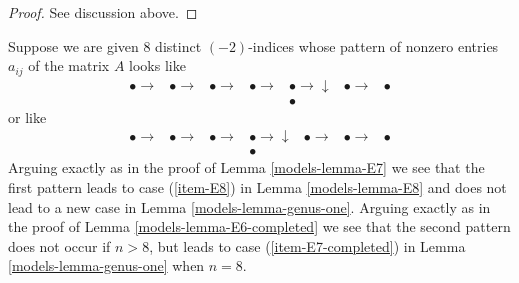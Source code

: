 \begin{proof}
See discussion above.
\end{proof}

Suppose we are given $8$ distinct $(-2)$-indices whose pattern
of nonzero entries $a_{ij}$ of the matrix $A$ looks like
$$
\begin{array}{ccccccc}\bullet \longrightarrow & \bullet \longrightarrow & \bullet \longrightarrow & \bullet \longrightarrow & \bullet \longrightarrow\downarrow & \bullet \longrightarrow & \bullet \\  &  &  &  & \bullet &  & \end{array}
$$
or like
$$
\begin{array}{ccccccc}\bullet \longrightarrow & \bullet \longrightarrow & \bullet \longrightarrow & \bullet \longrightarrow\downarrow & \bullet \longrightarrow & \bullet \longrightarrow & \bullet \\  &  &  & \bullet &  &  & \end{array}
$$
Arguing exactly as in the proof of Lemma \ref{models-lemma-E7}
we see that the first pattern leads to case
(\ref{item-E8}) in Lemma \ref{models-lemma-E8}
and does not lead to a new case in Lemma \ref{models-lemma-genus-one}.
Arguing exactly as in the proof of Lemma \ref{models-lemma-E6-completed}
we see that the second pattern does not occur if
$n > 8$, but leads to case (\ref{item-E7-completed})
in Lemma \ref{models-lemma-genus-one} when $n = 8$.

